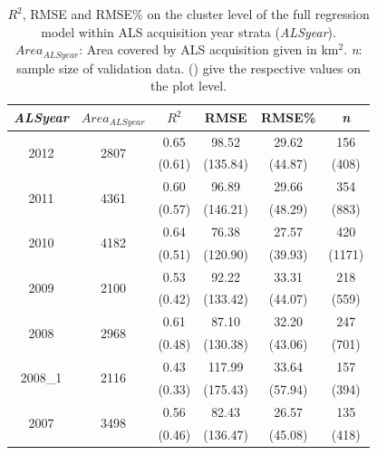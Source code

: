\documentclass[remotesensing,article,accept,moreauthors,pdftex,10pt,a4paper]{Definitions/mdpi}
\begin{document}
\begin{table}[H]
	\begin{center}
		\caption{$R^2$, RMSE and RMSE\% on the cluster level of the full regression model within ALS acquisition year strata (\textit{ALSyear}). $Area_{ALSyear}$: Area covered by ALS acquisition given in km$^2$. \textit{n}: sample size of validation data. () give the respective values on the plot level.}
		\label{tab:adj_r2_within}
		{\small %
			\begin{tabular}{cccccc}
				\toprule
				\textit{\textbf{ALSyear}} & \boldmath$Area_{ALSyear}$ & \boldmath$R^2$ & \textbf{RMSE} &\textbf{ RMSE\%} &\emph{\textbf{ n}} \\ 
				\midrule
				\multirow{2}{*}{2012}  & \multirow{2}{*}{2807}  &  0.65  &  98.52  &  29.62 &  156  \\ 
				&&             (0.61) & (135.84) & (44.87) & (408) \\ \midrule

				\multirow{2}{*}{2011}  & \multirow{2}{*}{4361}  &  0.60   & 96.89   &  29.66 & 354  \\ 
				&&             (0.57)  & (146.21) & (48.29) & (883) \\ \midrule

				\multirow{2}{*}{2010} & \multirow{2}{*}{4182}     & 0.64  & 76.38   & 27.57 & 420 \\ 
				&&             (0.51)  & (120.90) & (39.93) & (1171) \\\midrule
  
				\multirow{2}{*}{2009} & \multirow{2}{*}{2100}     & 0.53  & 92.22  & 33.31 & 218  \\   
				&&             (0.42)  & (133.42) & (44.07) & (559) \\ \midrule
             
				\multirow{2}{*}{2008} & \multirow{2}{*}{2968}     & 0.61  & 87.10   & 32.20 & 247  \\        
				&&             (0.48)  & (130.38) & (43.06) & (701) \\ \midrule
	                    
				\multirow{2}{*}{2008\_1} & \multirow{2}{*}{2116}  & 0.43  & 117.99  & 33.64 & 157  \\      
				&&             (0.33)  & (175.43) & (57.94) & (394) \\ \midrule
         
				\multirow{2}{*}{2007} & \multirow{2}{*}{3498}     & 0.56  & 82.43  & 26.57 & 135 \\ 
				&&             (0.46)  & (136.47)  & (45.08) & (418) \\\midrule
	

\end{tabular}}
\end{center}
\end{table}
\end{document}
